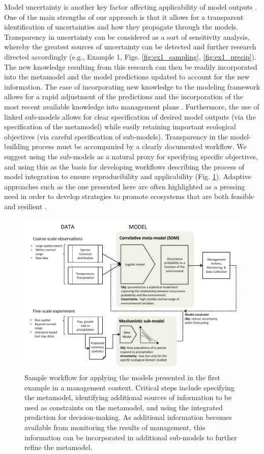 \documentclass[11pt]{article}
\begin{document}
Model uncertainty is another key factor affecting applicability of model outputs \citep{Addison2013}.
One of the main strengths of our approach is that it allows for a transparent identification of uncertainties and how they propagate through the models. 
Transparency in uncertainty can be considered as a sort of sensitivity analysis, whereby the greatest sources of uncertainty can be detected and further research directed accordingly (e.g., Example 1, Figs. \ref{fig:ex1_sampling}, \ref{fig:ex1_precip}).
The new knowledge resulting from this research can then be readily incorporated into the metamodel and the model predictions updated to account for the new information. 
The ease of incorporating new knowledge to the modeling framework allows for a rapid adjustment of the predictions and the incorporation of the most recent available knowledge into management plans \citep{Keith2011}.
Furthermore, the use of linked sub-models allows for clear specification of desired model outputs (via the specification of the metamodel) while easily retaining important ecological objectives (via careful specification of sub-models).
Transparency in the model-building process must be accompanied by a clearly documented  workflow.
We suggest using the sub-models as a natural proxy for specifying specific objectives, and using this as the basis for developing workflows describing the process of model integration to ensure reproducibility and applicability (Fig. \ref{fig:management}). 
Adaptive approaches such as the one presented here are often highlighted as a pressing need in order to develop strategies to promote ecosystems that are both feasible and resilient \citep{Seastedt2008}.

\begin{figure}[t]
	\includegraphics{figs/management.pdf}
	\caption{Sample workflow for applying the models presented in the first example in a management context.
	Critical steps include specifying the metamodel, identifying additional sources of information to be used as constraints on the metamodel, and using the integrated prediction for decision-making.
	As additional information becomes available from monitoring the results of management, this information can be incorporated in additional sub-models to further refine the metamodel.}
	\label{fig:management}
\end{figure}
\end{document}
